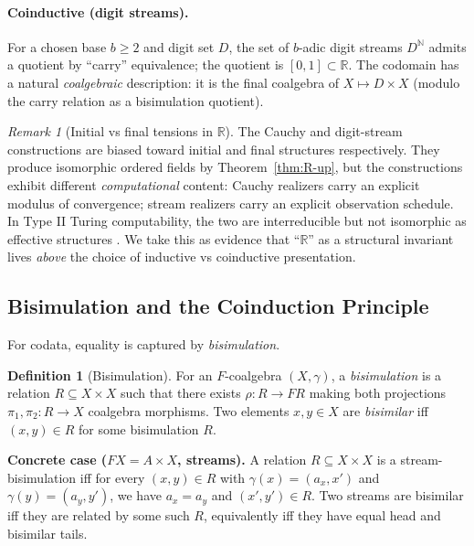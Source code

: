 \documentclass[12pt]{article}
\theoremstyle{definition}
\newtheorem{definition}[theorem]{Definition}
\theoremstyle{remark}
\newtheorem{remark}[theorem]{Remark}
\newcommand{\N}{\mathbb{N}}
\newcommand{\R}{\mathbb{R}}
\begin{document}
\paragraph{Coinductive (digit streams).}
For a chosen base $b \ge 2$ and digit set $D$, the set of $b$-adic digit streams $D^{\N}$ admits a quotient by ``carry'' equivalence; the quotient is $[0, 1] \subset \R$. The codomain has a natural \emph{coalgebraic} description: it is the final coalgebra of $X \mapsto D \times X$ (modulo the carry relation as a bisimulation quotient).

\begin{remark}[Initial vs final tensions in $\R$]
\label{rem:R-init-vs-fin}
The Cauchy and digit-stream constructions are biased toward initial and final structures respectively. They produce isomorphic ordered fields by Theorem~\ref{thm:R-up}, but the constructions exhibit different \emph{computational} content: Cauchy realizers carry an explicit modulus of convergence; stream realizers carry an explicit observation schedule. In Type II Turing computability, the two are interreducible but not isomorphic as effective structures \cite{Weihrauch2000}. We take this as evidence that ``$\R$'' as a structural invariant lives \emph{above} the choice of inductive vs coinductive presentation.
\end{remark}

\subsection{Bisimulation and the Coinduction Principle}

For codata, equality is captured by \emph{bisimulation}.

\begin{definition}[Bisimulation]
For an $F$-coalgebra $(X, \gamma)$, a \emph{bisimulation} is a relation $R \subseteq X \times X$ such that there exists $\rho \colon R \to F R$ making both projections $\pi_1, \pi_2 \colon R \to X$ coalgebra morphisms. Two elements $x, y \in X$ are \emph{bisimilar} iff $(x, y) \in R$ for some bisimulation $R$.

\textbf{Concrete case ($F X = A \times X$, streams).} A relation $R \subseteq X \times X$ is a stream-bisimulation iff for every $(x, y) \in R$ with $\gamma(x) = (a_x, x')$ and $\gamma(y) = (a_y, y')$, we have $a_x = a_y$ and $(x', y') \in R$. Two streams are bisimilar iff they are related by some such $R$, equivalently iff they have equal head and bisimilar tails.
\end{definition}
\end{document}
